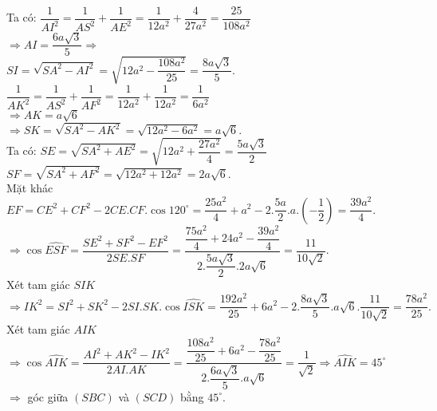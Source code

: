 \begin{ex}
{{
}
Ta có: $ \dfrac{1}{AI^2}=\dfrac{1}{AS^2}+\dfrac{1}{AE^2}=\dfrac{1}{12a^2}+\dfrac{4}{27a^2}=\dfrac{25}{108a^2}$\\
 $\Rightarrow AI=\dfrac{6a\sqrt{3}}{5}\Rightarrow$ \\
 $ SI=\sqrt{SA^2-AI^2}=\sqrt{12a^2-\dfrac{108a^2}{25}}=\dfrac{8a\sqrt{3}}{5}. $\\
$ \dfrac{1}{AK^2}=\dfrac{1}{AS^2}+\dfrac{1}{AF^2}=\dfrac{1}{12a^2}+\dfrac{1}{12a^2}=\dfrac{1}{6a^2}$\\
 $\Rightarrow AK=a\sqrt{6} $\\
$ \Rightarrow SK=\sqrt{SA^2-AK^2}=\sqrt{12a^2-6a^2}=a\sqrt{6}. $\\
Ta có: $ SE=\sqrt{SA^2+AE^2}=\sqrt{12a^2+\dfrac{27a^2}{4}}=\dfrac{5a\sqrt{3}}{2} $\\
$ SF=\sqrt{SA^2+AF^2}=\sqrt{12a^2+12a^2}=2a\sqrt{6}. $\\
Mặt khác $ EF=CE^2+CF^2-2CE.CF.\cos120^\circ=\dfrac{25a^2}{4}+a^2-2.\dfrac{5a}{2}.a.\left(-\dfrac{1}{2}\right)=\dfrac{39a^2}{4}. $\\ 
$ \Rightarrow \cos\widehat{ESF}=\dfrac{SE^2+SF^2-EF^2}{2SE.SF}=\dfrac{\dfrac{75a^2}{4}+24a^2-\dfrac{39a^2}{4}}{2.\dfrac{5a\sqrt{3}}{2}.2a\sqrt{6}}=\dfrac{11}{10\sqrt{2}}.$\\
Xét tam giác $ SIK$ \\
$\Rightarrow IK^2=SI^2+SK^2-2SI.SK.\cos\widehat{ISK}=\dfrac{192a^2}{25}+6a^2-2.\dfrac{8a\sqrt{3}}{5}.a\sqrt{6}. \dfrac{11}{10\sqrt{2}}=\dfrac{78a^2}{25}.$\\
Xét tam giác $ AIK $\\
$ \Rightarrow \cos\widehat{AIK}=\dfrac{AI^2+AK^2-IK^2}{2AI.AK}=\dfrac{\dfrac{108a^2}{25}+6a^2-\dfrac{78a^2}{25}}{2.\dfrac{6a\sqrt{3}}{5}.a\sqrt{6}}=\dfrac{1}{\sqrt{2}}\Rightarrow \widehat{AIK}=45^\circ$\\
$ \Rightarrow  $ góc giữa $ (SBC) $ và $ (SCD) $ bằng $ 45^\circ. $
}
\end{ex}
